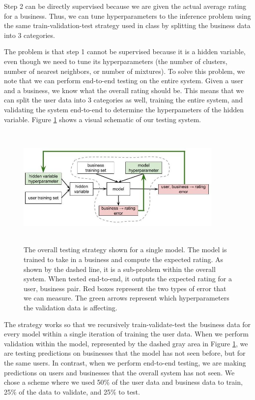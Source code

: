 \documentclass[11pt]{article}
\begin{document}
Step 2 can be directly supervised because we are given the actual average rating for a business. Thus, we can tune hyperparameters to the inference problem using the same train-validation-test strategy used in class by splitting the business data into 3 categories.

The problem is that step 1 cannot be supervised because it is a hidden variable, even though we need to tune its hyperparameters (the number of clusters, number of nearest neighbors, or number of mixtures). To solve this problem, we note that we can perform end-to-end testing on the entire system. Given a user and a business, we know what the overall rating should be. This means that we can split the user data into 3 categories as well, training the entire system, and validating the system end-to-end to determine the hyperpameters of the hidden variable. Figure \ref{fig:testing} shows a visual schematic of our testing system.

\begin{figure}[h!]
    \centering
    \includegraphics[width=0.9\textwidth, height=6cm]{testing_v2}
    \caption{The overall testing strategy shown for a single model. The model is trained to take in a business and compute the expected rating. As shown by the dashed line, it is a sub-problem within the overall system. When tested end-to-end, it outputs the expected rating for a user, business pair. Red boxes represent the two types of error that we can measure. The green arrows represent which hyperparameters the validation data is affecting.}
    \label{fig:testing}
\end{figure} 

The strategy works so that we recursively train-validate-test the business data for every model within a single iteration of training the user data. When we perform validation within the model, represented by the dashed gray area in Figure \ref{fig:testing}, we are testing predictions on businesses that the model has not seen before, but for the same users. In contrast, when we perform end-to-end testing, we are making predictions on users and businesses that the overall system has not seen. We chose a scheme where we used 50\% of the user data and business data to train, 25\% of the data to validate, and 25\% to test.
\end{document}
